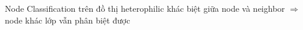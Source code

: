 \begin{frame}{Node Classification trên đồ thị heterophilic}
{    khác biệt giữa node và neighbor $\Rightarrow$ node khác lớp vẫn phân biệt được}
\end{frame}

